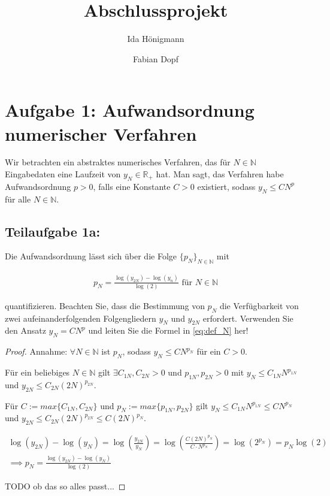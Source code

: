 \documentclass[]{article}
\title{Abschlussprojekt}
\author{Ida Hönigmann \and Fabian Dopf}
\begin{document}
\maketitle

\section*{Aufgabe 1: Aufwandsordnung numerischer Verfahren}
Wir betrachten ein abstraktes numerisches Verfahren, das für $N \in \mathbb{N}$ Eingabedaten eine Laufzeit von $y_N \in \mathbb{R}_+$ hat. Man sagt, das Verfahren habe Aufwandsordnung $p > 0$, falls eine Konstante $C > 0$ existiert, sodass $y_N \leq C N^p$ für alle $N \in \mathbb{N}$.

\subsection*{Teilaufgabe 1a:}
Die Aufwandsordnung lässt sich über die Folge $\{p_N\}_{N \in \mathbb{N}}$ mit

\begin{align}
	\label{eq:def_N}
	p_N = \frac{\log(y_{2N})-\log(y_n)}{\log(2)} \text{ für } N \in \mathbb{N}
\end{align}

quantifizieren. Beachten Sie, dass die Bestimmung von $p_N$ die Verfügbarkeit von zwei aufeinanderfolgenden Folgengliedern $y_N$ und $y_{2N}$ erfordert. Verwenden Sie den Ansatz $y_N = CN^p$ und leiten Sie die Formel in \ref{eq:def_N} her!

\begin{proof}
	Annahme: $\forall N \in \mathbb{N}$ ist $p_N$, sodass $y_N \leq C N^{p_N}$ für ein $C > 0$.
	
	Für ein beliebiges $N \in \mathbb{N}$ gilt $\exists C_{1N}, C_{2N} > 0$ und $p_{1N}, p_{2N} > 0$ mit $y_N \leq C_{1N} N^{p_{1N}}$ und $y_{2N} \leq C_{2N} (2N)^{p_{2N}}$.
	
	Für $C:=max\{C_{1N}, C_{2N}\}$ und $p_N:=max\{p_{1N}, p_{2N}\}$ gilt $y_N \leq C_{1N} N^{p_{1N}} \leq C N^{p_N}$ und $y_{2N} \leq C_{2N} (2N)^{p_{2N}} \leq C (2N)^{p_N}$.
	 
	\begin{align}
		\log(y_{2N}) - \log(y_N) = \log\left(\frac{y_{2N}}{y_N}\right) = \log\left(\frac{C(2N)^{p_N}}{C\cdot N^{p_N}}\right) = \log(2^{p_N}) = p_N \log(2) \\
		\implies p_N = \frac{\log(y_{2N}) - \log(y_N)}{\log(2)}
	\end{align}

	TODO ob das so alles passt...

\end{proof}
\end{document}
